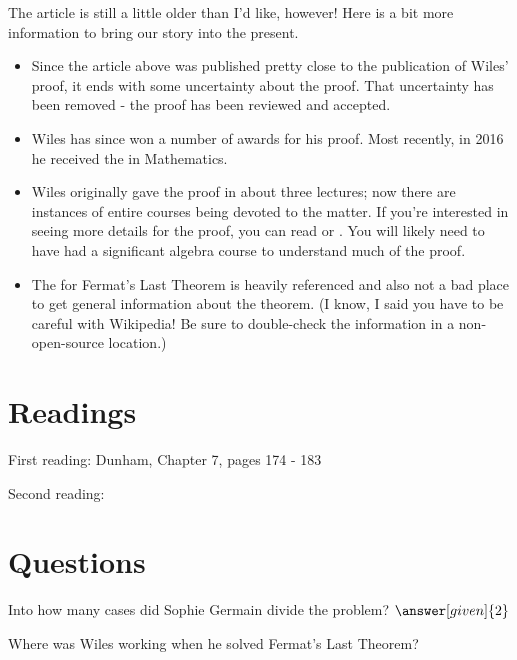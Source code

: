 \documentclass[nooutcomes]{ximera}
\begin{document}
The article is still a little older than I'd like, however!  Here is a bit more information to bring our story into the present.
\begin{itemize}
	\item Since the article above was published pretty close to
          the publication of Wiles' proof, it ends with some
          uncertainty about the proof.  That uncertainty has been
          removed - the proof has been reviewed and accepted.
	\item Wiles has since won a number of awards for his proof.  Most recently, in 2016 he received the  in Mathematics.  
	\item Wiles originally gave the proof in about three lectures; now there are instances of entire courses being devoted to the matter.  If you're interested in seeing more details for the proof, you can read  or .  You will likely need to have had a significant algebra course to understand much of the proof.
	\item The  for Fermat's Last Theorem is heavily referenced and also not a bad place to get general information about the theorem.  (I know, I said you have to be careful with Wikipedia!  Be sure to double-check the information in a non-open-source location.)
\end{itemize}

\section{Readings}
First reading: Dunham, Chapter 7, pages 174 - 183

Second reading: 



\section{Questions}

\begin{question}
Into how many cases did Sophie Germain divide the problem? $\answer[given]{2}$
\end{question}

\begin{question}
Where was Wiles working when he solved Fermat's Last Theorem?
\begin{multipleChoice}
\end{multipleChoice}
\end{question}

%
%


\end{document}
